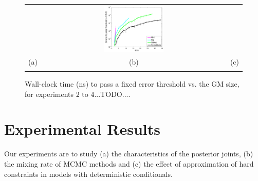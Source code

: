 \documentclass{article}
\newcommand{\nnn}{0.33}
\newcommand{\nnh}{0.23}
\begin{document}
\begin{figure}[t!]
\begin{center}
\begin{tabular}{ccc}
& \hspace{-3mm} \includegraphics[width=\nnn\textwidth, height=\nnh\textwidth]{plotsx/conductancex/time_vs_param-errorbar.pdf}
\vspace{-1.5mm}
\\
\hspace{-5mm} \footnotesize(a) 
& \hspace{-4mm} \footnotesize(b) 
& \hspace{-3mm} \footnotesize(c) \\
\multicolumn{3}{c}{}
\end{tabular}
\end{center}
\vspace{-8mm}
\caption{\footnotesize Wall-clock time (ns) to pass a fixed error threshold vs. the GM size, for experiments 2 to 4...TODO....}
\label{fig:resistor}
\vspace{-4mm}
\end{figure}



\section{Experimental Results}
\label{sect:experimental.results}
Our experiments are to study
(a) the characteristics of the posterior joints, 
(b) the mixing rate of MCMC methods and
(c) the effect of approximation of hard constraints
in models with deterministic conditionals. 
\end{document}
